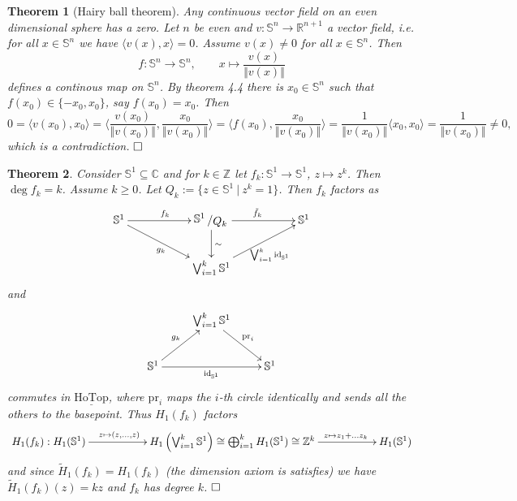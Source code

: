 \documentclass[11pt]{book}
\numberwithin{dummy}{section}
\newtheorem{theorem}{Theorem}[section]
\theoremstyle{nonumberbreak}
\newenvironment{pr}[1][]{\ifthenelse{\equal{#1}{}}{\proof}{\proof[#1]}\rm}{\endproof}
\newcommand{\hotop}{\underline{\mathrm{HoTop}}}
\newcommand{\Sph}{\mathbb{S}}
\newcommand{\la}{\longrightarrow}
\newcommand{\id}{\mathrm{id}}
\newcommand{\Z}{\mathbb{Z}}
\newcommand{\slant}[2]{{\raisebox{.1em}{$#1$}\left/\raisebox{-.1em}{$#2$}\right.}}
\begin{document}
\begin{spacing}{1.4}
\begin{theorem}[Hairy ball theorem]
Any continuous vector field on an even dimensional sphere has a zero.
\begin{pr}
Let $n$ be even and $v: \Sph^{n} \la \mathbb{R}^{n+1}$ a vector field, i.e. for all $x \in \Sph^n$ we have $\langle v(x),x\rangle=0$. Assume $v(x) \neq 0$ for all $x \in \Sph^n$. Then
$$f: \Sph^{n} \la \Sph^{n}, \qquad x \mapsto \frac{v(x)}{\Vert v(x)\Vert}$$
defines a continous map on $\Sph^{n}$. By theorem 4.4 there is $x_0 \in \Sph^{n}$ such that $f(x_0) \in \{ -x_0, x_0\}$, say $f(x_0)=x_0$. Then 
$$0=\langle v(x_0), x_0\rangle = \langle \frac{v(x_0)}{\Vert v(x_0)\Vert} , \frac{x_0}{\Vert v(x_0)\Vert} \rangle = \langle f(x_0), \frac{x_0}{\Vert v(x_0)\Vert} \rangle = \frac{1}{\Vert v(x_0)\Vert} \langle x_0, x_0\rangle = \frac{1}{\Vert v(x_0)\Vert} \neq 0,$$
which is a contradiction. $\hfill \Box$

\end{pr}

\end{theorem}



\begin{theorem}
Consider $\Sph^1 \subseteq \mathbb{C}$ and for $k \in \Z$ let $f_k: \Sph^1 \la \Sph^1$, $z \mapsto z^k$. Then $\deg f_k = k$.
\begin{pr}
Assume $k\geqslant 0$. Let $Q_k := \{ z \in \Sph^1 \ \vert \ z^k = 1\}$. Then $f_k$ factors as
$$
\begin{xy}
\xymatrix{
\Sph^1 \ar[rr]^{f_k} \ar[rrd]_{g_k} && \slant{\Sph^1}{Q_k} \ar[d]^{\sim} \ar[rr]^{\tilde{f}_k} && \Sph^1 \\ && \bigvee_{i=1}^k \Sph^1 \ar[rru]_{\bigvee_{i=1}^k \id_{\Sph^1}} &&
}
\end{xy}
$$
and 
$$
\begin{xy}
\xymatrix{
 & \bigvee_{i=1}^k \Sph^1 \ar[rd]^{\mathrm{pr}_i} & \\ \Sph^1 \ar[ru]^{g_k} \ar[rr]_{\id_{\Sph^1}} && \Sph^1
}
\end{xy}
$$
commutes in $\hotop$, where $\mathrm{pr}_i$ maps the $i$-th circle identically and sends all the others to the basepoint. Thus $H_1(f_k)$ factors
$$
\begin{xy}
\xymatrix{
H_1(f_k): H_1(\Sph^1) \ar[rr]^{z \mapsto (z, \ldots, z) \qquad \qquad} && H_1\left( \bigvee_{i=1}^k \Sph^1\right) \cong \bigoplus_{i=1}^k H_1(\Sph^1) \cong \Z^k \ar[rr]^{\qquad \qquad \qquad z \mapsto z_1 + \ldots z_k} && H_1(\Sph^1)
}
\end{xy}
$$
and since $\tilde{H}_1(f_k)= H_1(f_k)$ (the dimension axiom is satisfies) we have $\tilde{H}_1(f_k)(z) = kz$ and $f_k$ has degree $k$. $\hfill \Box$


\end{pr}
\end{theorem}
\end{spacing}
\end{document}
